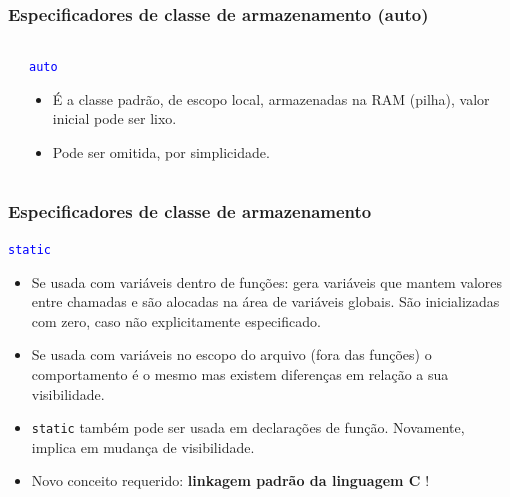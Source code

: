 \documentclass{beamer}
\begin{document}
\begin{frame}
	\frametitle{Especificadores de classe de armazenamento (auto)}
\begin{columns}[T] %
	\begin{column}{.60\textwidth}
		
	\end{column}%
	\hfill%
	\begin{column}{.40\textwidth}
		\begin{center}
			\texttt{\textcolor{blue}{auto}}
		\end{center}
		\vspace*{0.5cm}
		\begin{itemize}
			\item É a classe padrão, de escopo local, armazenadas na RAM (pilha), valor inicial pode ser lixo.
			\item Pode ser omitida, por simplicidade.
		\end{itemize}
	\end{column}%
\end{columns}
\end{frame}

\begin{frame}
	\frametitle{Especificadores de classe de armazenamento}
		\begin{center}
		\texttt{\textcolor{blue}{static}}
		\end{center}
		\vspace*{0.5cm}
		\begin{itemize}
			\item Se usada com variáveis dentro de funções: gera variáveis que mantem valores entre chamadas e são alocadas na área de variáveis globais. São inicializadas com zero, caso não explicitamente especificado.
			\item Se usada com variáveis no escopo do arquivo (fora das funções) o comportamento é o mesmo mas existem diferenças em relação a sua visibilidade.
			\item \texttt{static} também pode ser usada em declarações de função. Novamente, implica em mudança de visibilidade.
			\item Novo conceito requerido: \textbf{linkagem padrão da linguagem C} !
		\end{itemize}
\end{frame}
\end{document}

